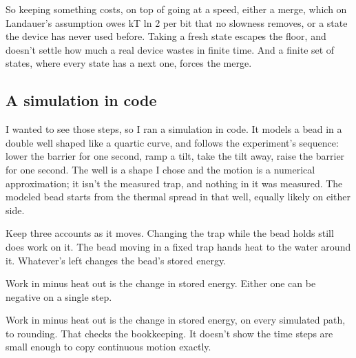 \documentclass[11pt,twoside]{article}
\theoremstyle{thielethm}
\theoremstyle{thieledef}
\theoremstyle{thieledef}
\theoremstyle{thieledef}
\theoremstyle{thielethm}
\theoremstyle{thieleobs}
\theoremstyle{thielethm}
\begin{document}
So keeping something costs, on top of going at a speed, either a merge, which on Landauer's assumption owes kT ln 2 per bit that no slowness removes, or a state the device has never used before. Taking a fresh state escapes the floor, and doesn't settle how much a real device wastes in finite time. And a finite set of states, where every state has a next one, forces the merge.

\subsection{A simulation in code}

I wanted to see those steps, so I ran a simulation in code. It models a bead in a double well shaped like a quartic curve, and follows the experiment's sequence: lower the barrier for one second, ramp a tilt, take the tilt away, raise the barrier for one second. The well is a shape I chose and the motion is a numerical approximation; it isn't the measured trap, and nothing in it was measured. The modeled bead starts from the thermal spread in that well, equally likely on either side.

Keep three accounts as it moves. Changing the trap while the bead holds still does work on it. The bead moving in a fixed trap hands heat to the water around it. Whatever's left changes the bead's stored energy.

\begin{center}

\small Work in minus heat out is the change in stored energy.
Either one can be negative on a single step.
\end{center}

Work in minus heat out is the change in stored energy, on every simulated path, to rounding. That checks the bookkeeping. It doesn't show the time steps are small enough to copy continuous motion exactly.
\end{document}
